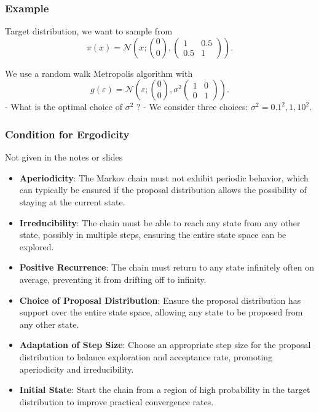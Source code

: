 \documentclass{article}
\begin{document}
\subsubsection{Example}
Target distribution, we want to sample from
$$
\pi(x)=\mathcal{N}\left(x ;\binom{0}{0},\left(\begin{array}{cc}
1 & 0.5 \\
0.5 & 1
\end{array}\right)\right) .
$$

We use a random walk Metropolis algorithm with
$$
g(\varepsilon)=\mathcal{N}\left(\varepsilon ;\binom{0}{0}, \sigma^2\left(\begin{array}{ll}
1 & 0 \\
0 & 1
\end{array}\right)\right) .
$$
- What is the optimal choice of $\sigma^2$ ?
- We consider three choices: $\sigma^2=0.1^2, 1,10^2$.
\subsubsection{Condition for Ergodicity}
Not given in the notes or slides

\begin{itemize}
    \item \textbf{Aperiodicity}: The Markov chain must not exhibit periodic behavior, which can typically be ensured if the proposal distribution allows the possibility of staying at the current state.
    \item \textbf{Irreducibility}: The chain must be able to reach any state from any other state, possibly in multiple steps, ensuring the entire state space can be explored.
    \item \textbf{Positive Recurrence}: The chain must return to any state infinitely often on average, preventing it from drifting off to infinity.
\end{itemize}

\begin{itemize}
    \item \textbf{Choice of Proposal Distribution}: Ensure the proposal distribution has support over the entire state space, allowing any state to be proposed from any other state.
    \item \textbf{Adaptation of Step Size}: Choose an appropriate step size for the proposal distribution to balance exploration and acceptance rate, promoting aperiodicity and irreducibility.
    \item \textbf{Initial State}: Start the chain from a region of high probability in the target distribution to improve practical convergence rates.
\end{itemize}
\end{document}
